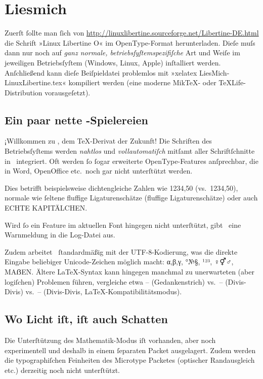 ﻿\documentclass{scrartcl}
\begin{document}
\section*{Liesmich}
Zuerſt ſollte man ſich von \url{http://linuxlibertine.sourceforge.net/Libertine-DE.html} die Schrift »Linux Libertine O« im OpenType-Format herunterladen. Dieſe muſs dann nur noch auf \emph{ganz normale, betriebsſyſtemspezifiſche} Art und Weiſe im jeweiligen Betriebsſyſtem (Windows, Linux, Apple) inſtalliert werden. Anſchließend kann dieſe Beiſpieldatei problemlos mit »xelatex LiesMich-LinuxLibertine.tex« kompiliert werden (eine moderne Mik\TeX- oder \TeX Life-Distribution vorausgeſetzt).


\subsection*{Ein paar nette \XeLaTeX-Spielereien}
¡Willkommen zu \XeLaTeX, dem \TeX-Derivat der Zukunft! Die Schriften des Betriebsſyſtems werden \emph{nahtlos} und \emph{vollautomatiſch} mitſamt aller Schriftſchnitte in \XeTeX\ integriert. Oft werden ſo ſogar erweiterte OpenType-Features anſprechbar, die in Word, OpenOffice etc.\ noch gar nicht unterſtützt werden.

Dies betrifft beispielsweise dichtengleiche Zahlen wie {1234,50} (vs.\ 1234,50), normale wie ſeltene {fluffige Ligaturenschätze} (fluffige Ligaturenschätze) oder auch {ECHTE KAPITÄLCHEN}.

Wird ſo ein Feature im aktuellen Font hingegen nicht unterſtützt, gibt \XeTeX\ eine Warnmeldung in die Log-Datei aus.

Zudem arbeitet \XeLaTeX\ ſtandardmäßig mit der UTF-8-Kodierung, was die direkte Eingabe beliebiger Unicode-Zeichen möglich macht: α,β,γ, °№§, ¹²³, ♀⚥♂, MAẞEN. Ältere \LaTeX-Syntax kann hingegen manchmal zu unerwarteten (aber logiſchen) Problemen führen, vergleiche etwa – (Gedankenstrich) vs.\ -- (Divis-Divis) vs.\ {-- (Divis-Divis, \LaTeX-Kompatibilitätsmodus)}.


\subsection*{Wo Licht iſt, iſt auch Schatten}
Die Unterſtützung des Mathematik-Modus iſt vorhanden, aber noch experimentell und deshalb in einem ſeparaten Packet ausgelagert. Zudem werden die typographiſchen Feinheiten des Microtype Packetes (optischer Randausgleich etc.) derzeitig noch nicht unterſtützt.



\end{document}
